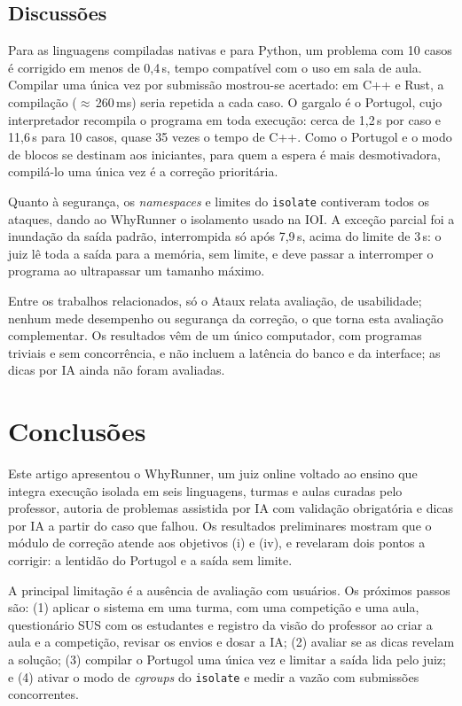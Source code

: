 \documentclass[12pt]{article}
\begin{document}
\subsection{Discussões}

Para as linguagens compiladas nativas e para Python, um problema com 10 casos é corrigido em menos de 0,4\,s, tempo compatível com o uso em sala de aula. Compilar uma única vez por submissão mostrou-se acertado: em C++ e Rust, a compilação ($\approx$\,260\,ms) seria repetida a cada caso. O gargalo é o Portugol, cujo interpretador recompila o programa em toda execução: cerca de 1,2\,s por caso e 11,6\,s para 10 casos, quase 35 vezes o tempo de C++. Como o Portugol e o modo de blocos se destinam aos iniciantes, para quem a espera é mais desmotivadora, compilá-lo uma única vez é a correção prioritária.

Quanto à segurança, os \emph{namespaces} e limites do \texttt{isolate} \cite{mares2012isolate} contiveram todos os ataques, dando ao WhyRunner o isolamento usado na IOI. A exceção parcial foi a inundação da saída padrão, interrompida só após 7,9\,s, acima do limite de 3\,s: o juiz lê toda a saída para a memória, sem limite, e deve passar a interromper o programa ao ultrapassar um tamanho máximo.

Entre os trabalhos relacionados, só o Ataux \cite{silva2021ataux} relata avaliação, de usabilidade; nenhum mede desempenho ou segurança da correção, o que torna esta avaliação complementar. Os resultados vêm de um único computador, com programas triviais e sem concorrência, e não incluem a latência do banco e da interface; as dicas por IA ainda não foram avaliadas.

\section{Conclusões}\label{sec:conclusoes}

Este artigo apresentou o WhyRunner, um juiz online voltado ao ensino que integra execução isolada em seis linguagens, turmas e aulas curadas pelo professor, autoria de problemas assistida por IA com validação obrigatória e dicas por IA a partir do caso que falhou. Os resultados preliminares mostram que o módulo de correção atende aos objetivos (i) e (iv), e revelaram dois pontos a corrigir: a lentidão do Portugol e a saída sem limite.

A principal limitação é a ausência de avaliação com usuários. Os próximos passos são: (1) aplicar o sistema em uma turma, com uma competição e uma aula, questionário SUS \cite{brooke1996sus} com os estudantes e registro da visão do professor ao criar a aula e a competição, revisar os envios e dosar a IA; (2) avaliar se as dicas revelam a solução; (3) compilar o Portugol uma única vez e limitar a saída lida pelo juiz; e (4) ativar o modo de \emph{cgroups} do \texttt{isolate} e medir a vazão com submissões concorrentes.



\end{document}
